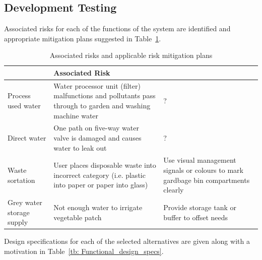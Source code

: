 \documentclass[a4paper,11pt,fleqn]{report}
\begin{document}
\subsection{Development Testing}
Associated risks for each of the functions of the system are identified and appropriate mitigation plans suggested in Table~\ref{tb: Functional_risk_mitigation}.
%
\begin{table}[h!]
\caption {Associated risks and applicable risk mitigation plans} \label{tb: Functional_risk_mitigation} 
\begin{center}
\begin{tabular}{p{3cm}|p{5cm}|p{5cm}}\toprule
	{\textbf{Function} & \textbf{Associated Risk}} & {\textbf{Risk Mitigation}\\ \midrule
    \hline
    Process used water & Water processor unit (filter) malfunctions and pollutants pass through to garden and washing machine water & ?\\
     \hline
    Direct water & One path on five-way water valve is damaged and causes water to leak out & ?\\
     \hline
    Waste sortation & User places disposable waste into incorrect category (i.e. plastic into paper or paper into glass) & Use visual management signals or colours to mark gardbage bin compartments clearly
\\
    \hline
Grey water storage supply & Not enough water to irrigate vegetable patch & Provide storage tank or buffer to offset needs\\
    \bottomrule
\end{tabular}
\end{center}
\end{table}
%
Design specifications for each of the selected alternatives are given along with a motivation in Table~\ref{tb: Functional_design_specs}.
%
\end{document}
